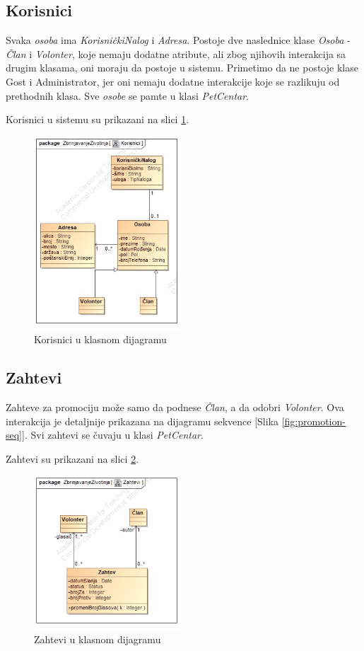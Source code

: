 \subsection{Korisnici}
\par Svaka \textit{osoba} ima \textit{KorisničkiNalog} i \textit{Adresa}.
Postoje dve naslednice klase \textit{Osoba} - \textit{Član} i \textit{Volonter}, koje nemaju dodatne atribute, ali zbog njihovih interakcija
sa drugim klasama, oni moraju da postoje u sistemu. Primetimo da ne postoje klase Gost i Administrator, jer oni nemaju dodatne interakcije
koje se razlikuju od prethodnih klasa. Sve \textit{osobe} se pamte u klasi \textit{PetCentar}.
\par Korisnici u sistemu su prikazani na slici \ref{fig:users}. 
\begin{figure}[h]
    \centering
    \includegraphics[width=0.5\textwidth, height=0.4\textwidth]{img/users.jpg}
    \caption{Korisnici u klasnom dijagramu}
    \label{fig:users}
\end{figure}
\subsection{Zahtevi}
\par Zahteve za promociju može samo da podnese \textit{Član}, a da odobri \textit{Volonter}. Ova interakcija je detaljnije prikazana 
na dijagramu sekvence [Slika \ref{fig:promotion-seq}]. Svi zahtevi se čuvaju u klasi \textit{PetCentar}.
\par Zahtevi su prikazani na slici \ref{fig:reqs}.
\begin{figure}[h]
    \centering
    \includegraphics[width=0.5\textwidth, height=0.4\textwidth]{img/requests.jpg}
    \caption{Zahtevi u klasnom dijagramu}
    \label{fig:reqs}
\end{figure}
